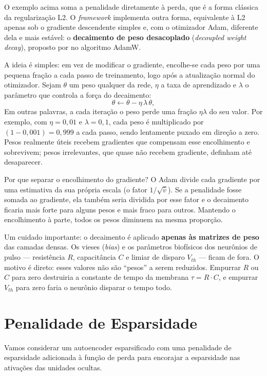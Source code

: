 \begin{apendicesenv}
		\par O exemplo acima soma a penalidade diretamente à perda, que é a forma clássica da regularização L2. O \textit{framework} implementa outra forma, equivalente à L2 apenas sob o gradiente descendente simples e, com o otimizador Adam, diferente dela e mais estável: o \textbf{decaimento de peso desacoplado} (\textit{decoupled weight decay}), proposto por  no algoritmo AdamW.

		\par A ideia é simples: em vez de modificar o gradiente, encolhe-se cada peso por uma pequena fração a cada passo de treinamento, logo após a atualização normal do otimizador. Sejam $\theta$ um peso qualquer da rede, $\eta$ a taxa de aprendizado e $\lambda$ o parâmetro que controla a força do decaimento:
		\begin{equation}
			\theta \leftarrow \theta - \eta\, \lambda\, \theta,
		\end{equation}
		Em outras palavras, a cada iteração o peso perde uma fração $\eta\lambda$ do seu valor. Por exemplo, com $\eta = 0{,}01$ e $\lambda = 0{,}1$, cada peso é multiplicado por $(1 - 0{,}001) = 0{,}999$ a cada passo, sendo lentamente puxado em direção a zero. Pesos realmente úteis recebem gradientes que compensam esse encolhimento e sobrevivem; pesos irrelevantes, que quase não recebem gradiente, definham até desaparecer.

		\par Por que separar o encolhimento do gradiente? O Adam divide cada gradiente por uma estimativa da sua própria escala (o fator $1/\sqrt{\hat{v}}$). Se a penalidade fosse somada ao gradiente, ela também seria dividida por esse fator e o decaimento ficaria mais forte para alguns pesos e mais fraco para outros. Mantendo o encolhimento à parte, todos os pesos diminuem na mesma proporção.

		\par Um cuidado importante: o decaimento é aplicado \textbf{apenas às matrizes de peso} das camadas densas. Os vieses (\textit{bias}) e os parâmetros biofísicos dos neurônios de pulso --- resistência $R$, capacitância $C$ e limiar de disparo $V_{th}$ --- ficam de fora. O motivo é direto: esses valores não são ``pesos'' a serem reduzidos. Empurrar $R$ ou $C$ para zero destruiria a constante de tempo da membrana $\tau = R\cdot C$, e empurrar $V_{th}$ para zero faria o neurônio disparar o tempo todo.

	\section{Penalidade de Esparsidade}
		\par Vamos considerar um autoencoder esparsificado com uma penalidade de esparsidade adicionada à função de perda para encorajar a esparsidade nas ativações das unidades ocultas.



\end{apendicesenv}
